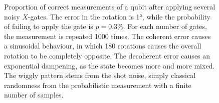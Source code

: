 \begin{figure}
    \centering
    \caption[
        Effect of noise on the likelihood of a correct measurement.
    ]
    {
        Proportion of correct measurements of a qubit after applying several noisy $X$-gates.
        The error in the rotation is \ang{1}, while the probability of failing to apply the gate is $p=0.3\%$.
        For each number of gates, the measurement is repeated 1000 times.
        The coherent error causes a sinusoidal behaviour, in which 180 rotations causes the overall rotation to be completely opposite.
        The decoherent error causes an exponential dampening, as the state becomes more and more mixed.
        The wiggly pattern stems from the shot noise, simply classical randomness from the probabilistic measurement with a finite number of samples.
    }
    \label{fig:noise_graph}
\end{figure}

